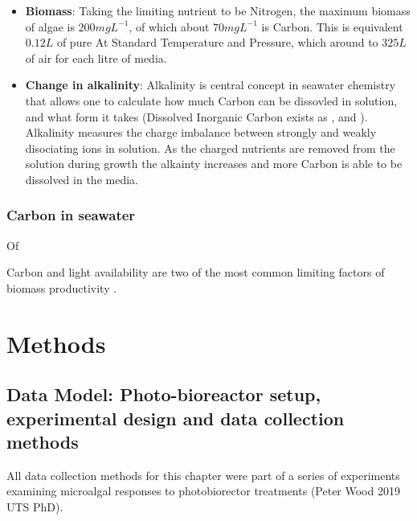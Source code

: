 \documentclass{ruthesis}
\begin{document}
\begin{itemize}
\item{\textbf{Biomass}:} Taking the limiting nutrient to be Nitrogen, the maximum biomass of algae is $200 mg L^{-1}$, of which about $70 mg L^{-1}$ is Carbon.  This is equivalent  $0.12 L$ of pure  At Standard Temperature and Pressure, which around to $325 L$ of air for each litre of media.

\item{\textbf{Change in alkalinity}:} Alkalinity is central concept in seawater chemistry that allows one to calculate how much Carbon can be dissovled in solution, and what form it takes (Dissolved Inorganic Carbon exists as ,  and ).  Alkalinity measures the charge imbalance between strongly and weakly disociating ions in solution.  As the charged nutrients are removed from the solution during growth the alkainty increases and more Carbon is able to be dissolved in the media.
\end{itemize}

\subsubsection{Carbon in seawater}
 Of
 
 

Carbon and light availability are two of the most common limiting factors of biomass productivity \cite{posten2009design}.








\section{Methods}

\subsection{Data Model: Photo-bioreactor setup, experimental design and data collection methods}

All data collection methods for this chapter were part of a series of experiments examining microalgal responses to photobiorector treatments (Peter Wood 2019 UTS PhD).
\end{document}
